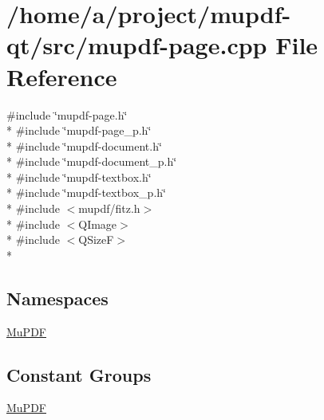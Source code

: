 \hypertarget{mupdf-page_8cpp}{\section{/home/a/project/mupdf-\/qt/src/mupdf-\/page.cpp File Reference}
\label{mupdf-page_8cpp}
}
{\ttfamily \#include \char`\"{}mupdf-\/page.\-h\char`\"{}}\\*
{\ttfamily \#include \char`\"{}mupdf-\/page\-\_\-p.\-h\char`\"{}}\\*
{\ttfamily \#include \char`\"{}mupdf-\/document.\-h\char`\"{}}\\*
{\ttfamily \#include \char`\"{}mupdf-\/document\-\_\-p.\-h\char`\"{}}\\*
{\ttfamily \#include \char`\"{}mupdf-\/textbox.\-h\char`\"{}}\\*
{\ttfamily \#include \char`\"{}mupdf-\/textbox\-\_\-p.\-h\char`\"{}}\\*
{\ttfamily \#include $<$mupdf/fitz.\-h$>$}\\*
{\ttfamily \#include $<$Q\-Image$>$}\\*
{\ttfamily \#include $<$Q\-Size\-F$>$}\\*
\subsection*{Namespaces}
\begin{DoxyCompactItemize}
\item 
\hyperlink{namespace_mu_p_d_f}{Mu\-P\-D\-F}
\end{DoxyCompactItemize}
\subsection*{Constant Groups}
\begin{DoxyCompactItemize}
\item 
\hyperlink{namespace_mu_p_d_f}{Mu\-P\-D\-F}
\end{DoxyCompactItemize}
